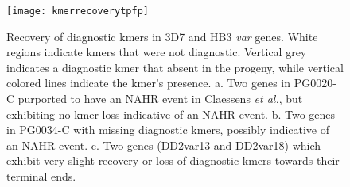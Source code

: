 \begin{figure}[h!]
  \centering
    \texttt{[image: kmerrecoverytpfp]}
  \caption{Recovery of diagnostic kmers in 3D7 and HB3 \textit{var} genes.  White regions indicate kmers that were not diagnostic.  Vertical grey indicates a diagnostic kmer that absent in the progeny, while vertical colored lines indicate the kmer's presence.  a. Two genes in PG0020-C purported to have an NAHR event in Claessens \textit{et al.}, but exhibiting no kmer loss indicative of an NAHR event.  b. Two genes in PG0034-C with missing diagnostic kmers, possibly indicative of an NAHR event.  c. Two genes (DD2var13 and DD2var18) which exhibit very slight recovery or loss of diagnostic kmers towards their terminal ends.}
  \label{fig:kmerrecoverytpfp}
\end{figure}
